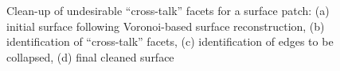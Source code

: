 \begin{figure}
{\label{fig:cross1-2}}
%
\caption{Clean-up of undesirable ``cross-talk'' facets for a surface patch: (a) initial surface following Voronoi-based surface reconstruction, (b) identification of ``cross-talk'' facets, (c) identification of edges to be collapsed, (d) final cleaned surface}
\label{fig:cross1}
\end{figure}

